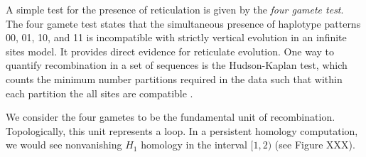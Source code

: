 A simple test for the presence of reticulation is given by the \emph{four gamete test}.
The four gamete test states that the simultaneous presence of haplotype patterns 00, 01, 10, and 11 is incompatible with strictly vertical evolution in an infinite sites model.
It provides direct evidence for reticulate evolution.
One way to quantify recombination in a set of sequences is the Hudson-Kaplan test, which counts the minimum number partitions required in the data such that within each partition the all sites are compatible \citep{Hudson:1985}.

We consider the four gametes to be the fundamental unit of recombination.
Topologically, this unit represents a loop.
In a persistent homology computation, we would see nonvanishing $H_1$ homology in the interval $[1,2)$ (see Figure XXX).



